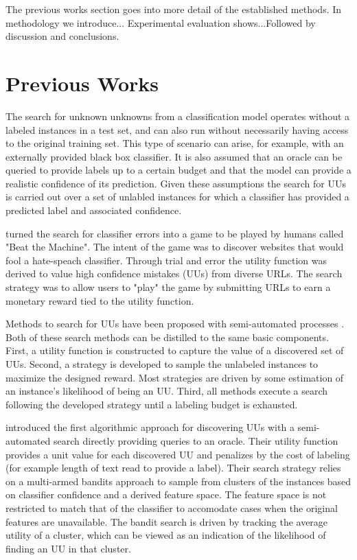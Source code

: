 \documentclass[letterpaper]{article} %
\newcommand{\wdb}[1]{{\color{blue} #1}} %
\begin{document}
\wdb{The previous works section goes into more detail of the established methods. In methodology we introduce... Experimental evaluation shows...Followed by discussion and conclusions.}

\section{Previous Works}

The search for unknown unknowns from a classification model operates without a labeled instances in a test set, and can also run without necessarily having access to the original training set. This type of scenario can arise, for example, with an externally provided black box classifier.  It is also assumed that an oracle can be queried to provide labels up to a certain budget and that the model can provide a realistic confidence of its prediction. Given these assumptions the search for UUs is carried out over a set of unlabled instances for which a classifier has provided a predicted label and associated confidence.  

\citet{Attenberg2015} turned the search for classifier errors into a game to be played by humans called "Beat the Machine". The intent of the game was to discover websites that would fool a hate-speach classifier. Through trial and error the utility function was derived to value high confidence mistakes (UUs) from diverse URLs. The search strategy was to allow users to "play" the game by submitting URLs to earn a monetary reward tied to the utility function. 

Methods to search for UUs have been proposed with semi-automated processes \citep{Lakkaraju2016, Bansal2018}.  Both of these search methods can be distilled to the same basic components.  First, a utility function is constructed to capture the value of a discovered set of UUs. Second, a strategy is developed to sample the unlabeled instances to maximize the designed reward.  Most strategies are driven by some estimation of an instance's likelihood of being an UU.  Third, all methods execute a search following the developed strategy until a labeling budget is exhausted.

\citet{Lakkaraju2016} introduced the first algorithmic approach for discovering UUs with a semi-automated search directly providing queries to an oracle.  Their utility function provides a unit value for each discovered UU and penalizes by the cost of labeling (for example length of text read to provide a label). Their search strategy relies on a multi-armed bandits approach to sample from clusters of the instances based on classifier confidence and a derived feature space.  The feature space is not restricted to match that of the classifier to accomodate cases when the original features are unavailable.  The bandit search is driven by tracking the average utility of a cluster, which can be viewed as an indication of the likelihood of finding an UU in that cluster. 
\end{document}
